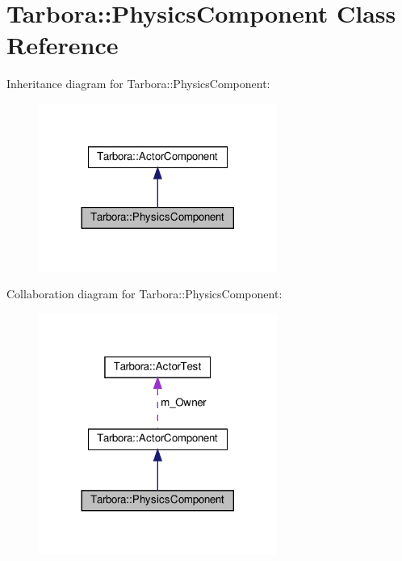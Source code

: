 \hypertarget{classTarbora_1_1PhysicsComponent}{}\section{Tarbora\+:\+:Physics\+Component Class Reference}
\label{classTarbora_1_1PhysicsComponent}


Inheritance diagram for Tarbora\+:\+:Physics\+Component\+:\nopagebreak
\begin{figure}[H]
\begin{center}
\leavevmode
\includegraphics[width=221pt]{classTarbora_1_1PhysicsComponent__inherit__graph}
\end{center}
\end{figure}


Collaboration diagram for Tarbora\+:\+:Physics\+Component\+:\nopagebreak
\begin{figure}[H]
\begin{center}
\leavevmode
\includegraphics[width=221pt]{classTarbora_1_1PhysicsComponent__coll__graph}
\end{center}
\end{figure}
